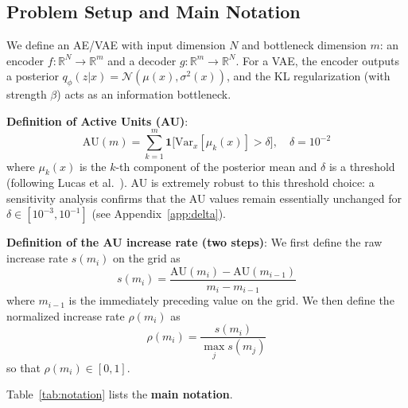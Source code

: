 \documentclass[make,article,submit,pdftex,moreauthors]{Definitions/mdpi}
\newcommand{\R}{\mathbb{R}}
\begin{document}
\subsection{Problem Setup and Main Notation}\label{sec:framework_setup}

We define an AE/VAE with input dimension $N$ and bottleneck dimension $m$:
an encoder $f: \R^N \to \R^m$ and a decoder $g: \R^m \to \R^N$.
For a VAE, the encoder outputs a posterior
$q_\phi(z|x) = \mathcal{N}(\mu(x), \sigma^2(x))$,
and the KL regularization (with strength $\beta$) acts as an information bottleneck.

\textbf{Definition of Active Units (AU)}:
\begin{equation}
  \mathrm{AU}(m) = \sum_{k=1}^{m} \mathbf{1}\bigl[\mathrm{Var}_x[\mu_k(x)] > \delta\bigr],
  \quad \delta = 10^{-2}
  \label{eq:au_def}
\end{equation}
where $\mu_k(x)$ is the $k$-th component of the posterior mean and $\delta$ is a
threshold (following Lucas et al.~\cite{lucas2019elbo}).
AU is extremely robust to this threshold choice: a sensitivity analysis confirms
that the AU values remain essentially unchanged for
$\delta \in [10^{-3}, 10^{-1}]$ (see Appendix~\ref{app:delta}).

\textbf{Definition of the AU increase rate (two steps)}:
We first define the raw increase rate $s(m_i)$ on the grid as
\begin{equation}
  s(m_i) = \frac{\mathrm{AU}(m_i) - \mathrm{AU}(m_{i-1})}{m_i - m_{i-1}}
  \label{eq:au_raw_rate}
\end{equation}
where $m_{i-1}$ is the immediately preceding value on the grid.
We then define the normalized increase rate $\rho(m_i)$ as
\begin{equation}
  \rho(m_i) = \frac{s(m_i)}{\max_j s(m_j)}
  \label{eq:au_rate}
\end{equation}
so that $\rho(m_i) \in [0, 1]$.

Table~\ref{tab:notation} lists the \textbf{main notation}.
\end{document}
